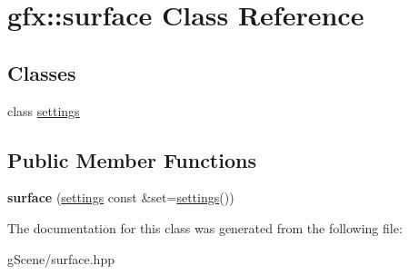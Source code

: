 \hypertarget{classgfx_1_1surface}{\section{gfx\-:\-:surface Class Reference}
\label{classgfx_1_1surface}
}
\subsection*{Classes}
\begin{DoxyCompactItemize}
\item 
class \hyperlink{classgfx_1_1surface_1_1settings}{settings}
\end{DoxyCompactItemize}
\subsection*{Public Member Functions}
\begin{DoxyCompactItemize}
\item 
\hypertarget{classgfx_1_1surface_a5db2e0fbda38382f33c5f3d3154341ca}{{\bfseries surface} (\hyperlink{classgfx_1_1surface_1_1settings}{settings} const \&set=\hyperlink{classgfx_1_1surface_1_1settings}{settings}())}\label{classgfx_1_1surface_a5db2e0fbda38382f33c5f3d3154341ca}

\end{DoxyCompactItemize}


The documentation for this class was generated from the following file\-:\begin{DoxyCompactItemize}
\item 
g\-Scene/surface.\-hpp\end{DoxyCompactItemize}
